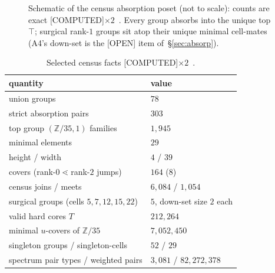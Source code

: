 \documentclass[11pt,a4paper]{article}
\theoremstyle{definition}
\begin{document}
\begin{figure}[t]
  \centering
  \caption{Schematic of the census absorption poset (not to scale):
    counts are exact [COMPUTED]$\times2$~\cite{D304,D308}.  Every group
    absorbs into the unique top $\top$; surgical rank-$1$ groups sit atop
    their unique minimal cell-mates (A4's down-set is the
    [OPEN] item of~\S\ref{sec:absorp}).}
  \label{fig:hasse}
\end{figure}

\begin{table}[t]
  \centering
  \caption{Selected census facts [COMPUTED]$\times2$~\cite{D304,D308,D312,D313,D316}.}
  \label{tab:census}
  \begin{tabular}{ll}
    \toprule
    quantity & value \\
    \midrule
    union groups & $78$ \\
    strict absorption pairs & $303$ \\
    top group $(\mathbb{Z}/35,1)$ families & $1{,}945$ \\
    minimal elements & $29$ \\
    height / width & $4$ / $39$ \\
    covers (rank-$0\lessdot$rank-$2$ jumps) & $164$ ($8$) \\
    census joins / meets & $6{,}084$ / $1{,}054$ \\
    surgical groups (cells $5,7,12,15,22$) & $5$, down-set size $2$ each \\
    valid hard cores $T$ & $212{,}264$ \\
    minimal $u$-covers of $\mathbb{Z}/35$ & $7{,}052{,}450$ \\
    singleton groups / singleton-cells & $52$ / $29$ \\
    spectrum pair types / weighted pairs & $3{,}081$ / $82{,}272{,}378$ \\
    \bottomrule
  \end{tabular}
\end{table}
\end{document}
